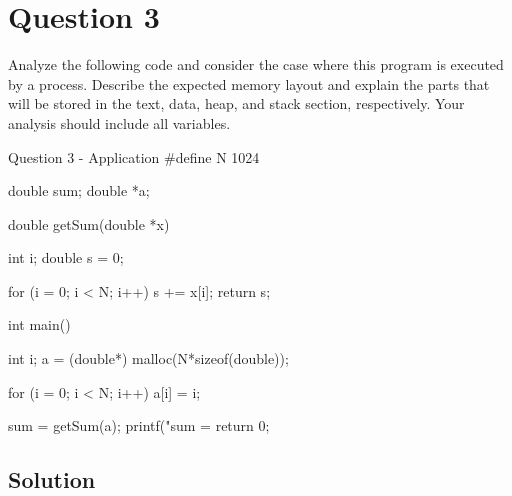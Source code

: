 \documentclass[../main.tex]{subfiles}
\begin{document}
\section{Question 3}

Analyze the following code and consider the case where this program is executed by a process. Describe the expected memory layout and explain the parts that will be stored in the text, data, heap, and stack section, respectively. Your analysis should include all variables.

\begin{cppminted}{Question 3 - Application}
#define N 1024

double sum;
double *a;

double getSum(double *x) {
    int i;
    double s = 0;

    for (i = 0; i < N; i++) {
        s += x[i];
    }
    return s;
}

int main() {
    int i;
    a = (double*) malloc(N*sizeof(double));

    for (i = 0; i < N; i++) {
        a[i] = i;
    }

    sum = getSum(a);
    printf("sum = %
    return 0;
}
\end{cppminted}

\subsection*{Solution}
\end{document}
